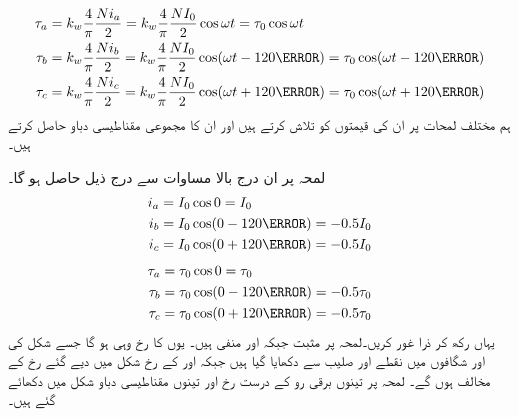 %
\begin{gather}
\begin{aligned}\label{مساوات_گھومتے_مشین_تین_دور_دباو}
\tau_a&=k_w \frac{4}{\pi}\frac{N i_a}{2}=k_w \frac{4}{\pi}\frac{N I_0}{2} \cos \omega t=\tau_0 \cos \omega t\\
\tau_b&=k_w \frac{4}{\pi}\frac{N i_b}{2}=k_w \frac{4}{\pi}\frac{N I_0}{2} \cos (\omega t-120\degree)=\tau_0 \cos (\omega t-120\degree)\\
\tau_c&=k_w \frac{4}{\pi}\frac{N i_c}{2}=k_w \frac{4}{\pi}\frac{N I_0}{2} \cos (\omega t+120\degree)=\tau_0 \cos (\omega t+120\degree)
\end{aligned}
\end{gather}
 ہم مختلف لمحات پر ان کی قیمتوں کو  تلاش کرتے ہیں اور ان کا مجموعی مقناطیسی دباو حاصل کرتے ہیں۔

لمحہ  پر ان درج بالا مساوات سے درج ذیل حاصل ہو گا۔
\begin{gather}
\begin{aligned}
i_a&=I_0 \cos 0=I_0\\
i_b&=I_0 \cos (0-120\degree)=-0.5 I_0\\
i_c&=I_0 \cos (0+120\degree)=-0.5 I_0
\end{aligned}
\end{gather}
%
\begin{gather}
\begin{aligned}
\tau_a&=\tau_0 \cos 0=\tau_0\\
\tau_b&=\tau_0 \cos (0-120\degree)=-0.5 \tau_0\\
\tau_c&=\tau_0 \cos (0+120\degree)=-0.5 \tau_0
\end{aligned}
\end{gather}
یہاں رکھ کر ذرا غور کریں۔لمحہ   پر   مثبت  جبکہ  اور  منفی ہیں۔ یوں   کا رخ وہی  ہو گا جسے  شکل   کی   اور  شگافوں میں نقطے اور صلیب سے  دکھایا گیا ہیں جبکہ   اور  کے رخ شکل میں دیے گئے رخ کے مخالف ہوں گے۔ لمحہ  پر  تینوں برقی رو کے درست رخ اور  تینوں مقناطیسی دباو  شکل   میں دکھائے گئے ہیں۔
